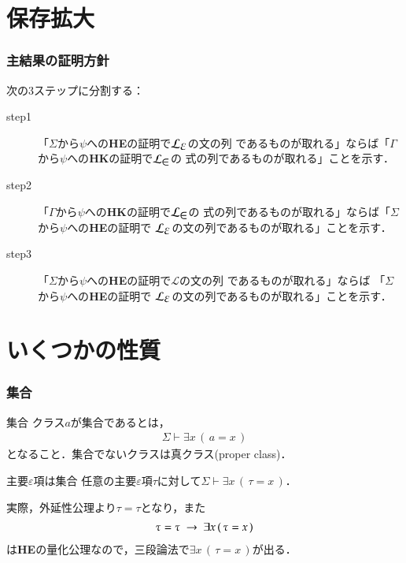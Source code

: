 \documentclass[dvipdfmx,10pt,notheorems]{beamer}
\theoremstyle{definition}
\newcommand{\lang}[1]{\mathcal{L}_{\scalebox{1.2}{$#1$}}} %
\newcommand{\rarrow}{\hspace{0.25em}\rightarrow\hspace{0.25em}} %
\begin{document}
\section{保存拡大}
\begin{frame}\frametitle{主結果の証明方針}
	次の3ステップに分割する：
	\begin{description}
		\item[step1]  「$\Sigma$から$\psi$への{\bf HE}の証明で$\lang{\varepsilon}$の文の列
			であるものが取れる」ならば「$\Gamma$から$\psi$への{\bf HK}の証明で$\lang{\in}$の
			式の列であるものが取れる」ことを示す．
		
		\item[step2] 「$\Gamma$から$\psi$への{\bf HK}の証明で$\lang{\in}$の
			式の列であるものが取れる」ならば「$\Sigma$から$\psi$への{\bf HE}の証明で
			$\lang{\varepsilon}$の文の列であるものが取れる」ことを示す．
		
		\item[step3]  「$\Sigma$から$\psi$への{\bf HE}の証明で$\mathcal{L}$の文の列
			であるものが取れる」ならば 「$\Sigma$から$\psi$への{\bf HE}の証明で
			$\lang{\varepsilon}$の文の列であるものが取れる」ことを示す．
	\end{description}
\end{frame}

\section{いくつかの性質}
\begin{frame}\frametitle{集合}
	\begin{exampleblock}{集合}
	クラス$a$が集合であるとは，
	\begin{align}
		\Sigma \vdash \exists x\, (\, a = x\, )
	\end{align}
	となること．集合でないクラスは真クラス(proper class)．
	\end{exampleblock}
	
	\begin{block}{主要$\varepsilon$項は集合}
		任意の主要$\varepsilon$項$\tau$に対して$\Sigma \vdash \exists x\, (\, \tau = x\, )$．
	\end{block}
	実際，外延性公理より$\tau = \tau$となり，また
	\begin{align}
		\tau = \tau \rarrow \exists x\, (\, \tau = x\, )
	\end{align}
	は{\bf HE}の量化公理なので，三段論法で$\exists x\, (\, \tau = x\, )$が出る．
\end{frame}
\end{document}
